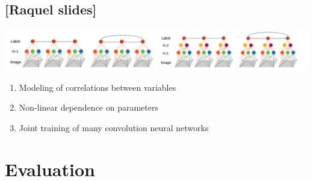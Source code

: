 \documentclass{beamer}
\begin{document}
\subsection*{[Raquel slides]}
\begin{frame}
	\begin{center}
		 \includegraphics[scale=0.25]{img/dsm_logo}
	\end{center}
	
	\begin{enumerate}
		\item Modeling of correlations between variables
		\item Non-linear dependence on parameters
		\item Joint training of many convolution neural networks
	\end{enumerate}	
\end{frame}

\section{Evaluation}
\frame{\tableofcontents[currentsection]}
\end{document}
